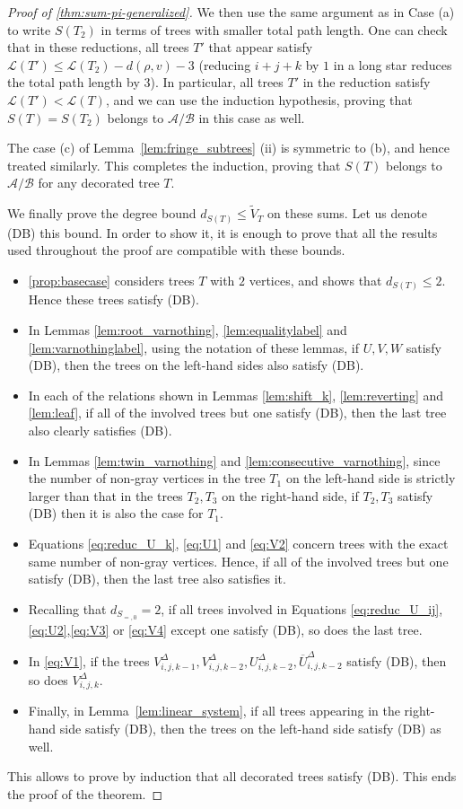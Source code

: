 \documentclass[12pt]{amsart}
\theoremstyle{plain}
\theoremstyle{remark}
\def\cL{\mathcal{L}}
\def\cA{\mathcal{A}}
\def\cB{\mathcal{B}}
\begin{document}
\begin{proof}[Proof of \cref{thm:sum-pi-generalized}]
  We then use the same argument as in Case (a)
 to write $S(T_2)$ in terms of trees with smaller total path length.
 One can check that in these reductions, all trees $T'$ that appear
 satisfy $\cL(T') \le \cL(T_2)-d(\rho,v)-3$
  (reducing $i+j+k$ by $1$ in a long star
 reduces the total path length by $3$).
 In particular, all trees $T'$ in the reduction satisfy $\cL(T')< \cL(T)$,
 and we can use the induction hypothesis, proving that  $S(T)=S(T_2)$ belongs to 
 $\cA/\cB$ in this case as well.
 \smallskip
 
The case (c) of Lemma~\ref{lem:fringe_subtrees} (ii) is symmetric to (b), and hence treated similarly. This completes the induction, proving that $S(T)$ belongs to 
 $\cA/\cB$ for any decorated tree $T$.
 \medskip

We finally prove the degree bound $d_{S(T)} \le \tilde V_T$ on these sums. 
Let us denote (DB) this bound.
In order to show it, it is enough to prove that all the results used throughout the proof are compatible with these bounds.

\begin{itemize}
\item \cref{prop:basecase} considers trees $T$ with $2$ vertices, and shows that $d_{S(T)} \le 2$. Hence these trees satisfy (DB).
\item In Lemmas \ref{lem:root_varnothing}, \ref{lem:equalitylabel} and \ref{lem:varnothinglabel}, using the notation of these lemmas, if $U,V,W$ satisfy (DB), then the trees on the left-hand sides also satisfy (DB).
\item In each of the relations shown in Lemmas \ref{lem:shift_k}, \ref{lem:reverting} and \ref{lem:leaf}, if all of the involved trees but one satisfy (DB), then the last tree also clearly satisfies (DB).
\item In Lemmas \ref{lem:twin_varnothing} and \ref{lem:consecutive_varnothing}, since the number of non-gray vertices in the tree $T_1$ on the left-hand side is strictly larger than that in the trees $T_2,T_3$ on the right-hand side, if $T_2,T_3$ satisfy (DB) then it is also the case for $T_1$.
\item Equations \eqref{eq:reduc_U_k}, \eqref{eq:U1} and \eqref{eq:V2} concern trees with the exact same number of non-gray vertices. Hence, if all of the involved trees but one satisfy (DB), then the last tree also satisfies it.  
\item Recalling that $d_{S_{=,0}}=2$, if all trees involved in Equations \eqref{eq:reduc_U_ij}, \eqref{eq:U2},\eqref{eq:V3} or \eqref{eq:V4} except one satisfy (DB), so does the last tree. 
\item In \eqref{eq:V1}, if the trees $V_{i,j,k-1}^{\Delta}, V_{i,j,k-2}^{\Delta}, U_{i,j,k-2}^{\Delta}, \overline{U}_{i,j,k-2}^{\Delta}$ satisfy (DB), then so does $V_{i,j,k}^{\Delta}$.
\item Finally, in Lemma~\ref{lem:linear_system}, if all trees appearing in the right-hand side satisfy (DB), then the trees on the left-hand side satisfy (DB) as well.
\end{itemize}
This allows to prove by induction that all decorated trees satisfy (DB). This ends the proof of the theorem.
\end{proof}
\end{document}
